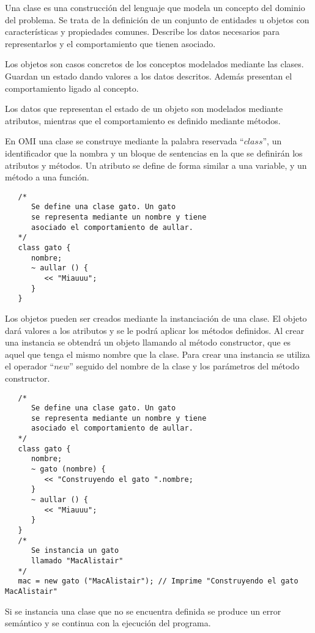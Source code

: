 Una clase es una construcción del lenguaje que modela un concepto del dominio del problema. Se trata de la definición de un conjunto de entidades u objetos
con características y propiedades comunes. Describe los datos necesarios para representarlos y el comportamiento que tienen asociado.

Los objetos son casos concretos de los conceptos modelados mediante las clases. Guardan un estado dando valores a los datos descritos.
Además presentan el comportamiento ligado al concepto. 

Los datos que representan el estado de un objeto son modelados mediante atributos, mientras que el comportamiento es definido mediante métodos.

En OMI una clase se construye mediante la palabra reservada ``$class$'', un identificador que la nombra y un bloque de sentencias en la que se 
definirán los atributos y métodos. Un atributo se define de forma similar a una variable, y un método a una función. \\

\begin{lstlisting}
   /*
      Se define una clase gato. Un gato 
      se representa mediante un nombre y tiene
      asociado el comportamiento de aullar.
   */
   class gato {
      nombre;
      ~ aullar () {
         << "Miauuu";
      }
   }
\end{lstlisting}

Los objetos pueden ser creados mediante la instanciación de una clase. El objeto dará valores
a los atributos y se le podrá aplicar los métodos definidos. Al crear una instancia se 
obtendrá un objeto llamando al método constructor, que es aquel que tenga el mismo nombre que la clase. 
Para crear una instancia se utiliza el operador ``$new$'' seguido del nombre de la clase y los parámetros 
del método constructor. \\ 

\begin{lstlisting}
   /*
      Se define una clase gato. Un gato 
      se representa mediante un nombre y tiene
      asociado el comportamiento de aullar.
   */
   class gato {
      nombre;
      ~ gato (nombre) {
         << "Construyendo el gato ".nombre;
      }
      ~ aullar () {
         << "Miauuu";
      }
   }
   /*
      Se instancia un gato 
      llamado "MacAlistair"
   */
   mac = new gato ("MacAlistair"); // Imprime "Construyendo el gato MacAlistair"
\end{lstlisting}

Si se instancia una clase que no se encuentra definida se produce un error semántico y se continua con la ejecución del programa.


